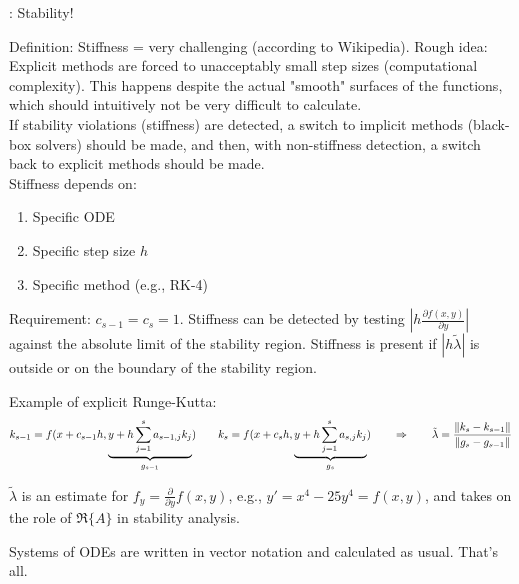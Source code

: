   \vspace{1em}
  : Stability!

  Definition: Stiffness = very challenging (according to Wikipedia). Rough idea: Explicit methods are forced to unacceptably small step sizes (computational complexity). This happens despite the actual "smooth" surfaces of the functions, which should intuitively not be very difficult to calculate.\\

  If stability violations (stiffness) are detected, a switch to implicit methods (black-box solvers) should be made, and then, with non-stiffness detection, a switch back to explicit methods should be made.\\

  Stiffness depends on:
  \begin{enumerate}
      \item Specific ODE
      \item Specific step size $h$
      \item Specific method (e.g., RK-4)
  \end{enumerate}

  Requirement: $c_{s-1} = c_s = 1$. Stiffness can be detected by testing $\left|h \frac{\partial f(x,y)}{\partial y} \right|$ against the absolute limit of the stability region. Stiffness is present if $|h \tilde{\lambda}|$ is outside or on the boundary of the stability region.

  Example of explicit Runge-Kutta:
  $$k_{s-1} = f(x+c_{s-1} h, \underbrace{y + h \sum\limits_{j=1}^s a_{s-1,j}k_j}_{g_{s-1}}) \qquad
  k_{s} = f(x+c_{s} h, \underbrace{y + h \sum\limits_{j=1}^s a_{s,j}k_j}_{g_{s}}) \qquad
  \Rightarrow \qquad \tilde{\lambda} = \frac{\Arrowvert k_s - k_{s-1} \Arrowvert}{\Arrowvert g_s - g_{s-1} \Arrowvert}$$

  $\tilde{\lambda}$ is an estimate for $f_y = \frac{\partial}{\partial y}f(x,y)$, e.g., $y'=x^4-25y^4=f(x,y)$, and takes on the role of $\Re \{A\}$ in stability analysis.

  Systems of ODEs are written in vector notation and calculated as usual. That's all.

